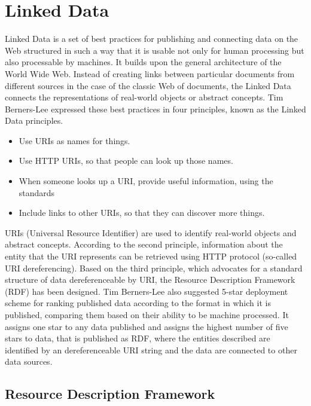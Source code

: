 \chapter{Linked Data\label{linkeddata}}

Linked Data is a set of best practices for publishing and connecting data on the Web structured in such a way that it is usable not only for human processing but also processable by machines. It builds upon the general architecture of the World Wide Web. Instead of creating links between particular documents from different sources in the case of the classic Web of documents, the Linked Data connects the representations of real-world objects or abstract concepts. Tim Berners-Lee expressed these best practices in four principles, known as the Linked Data principles.\cite{bernersLee2006}

\begin{itemize}
    \item Use URIs as names for things.
    \item Use HTTP URIs, so that people can look up those names.
    \item When someone looks up a URI, provide useful information, using the standards
    \item Include links to other URIs, so that they can discover more things.
\end{itemize}

URIs (Universal Resource Identifier) are used to identify real-world objects and abstract concepts. According to the second principle, information about the entity that the URI represents can be retrieved using HTTP protocol (so-called URI dereferencing). Based on the third principle, which advocates for a standard structure of data dereferenceable by URI, the Resource Description Framework (RDF) has been designed. Tim Berners-Lee also suggested 5-star deployment scheme for ranking published data according to the format in which it is published, comparing them based on their ability to be machine processed. It assigns one star to any data published and assigns the highest number of five stars to data, that is published as RDF, where the entities described are identified by an dereferenceable URI string and the data are connected to other data sources.

\section{Resource Description Framework}


